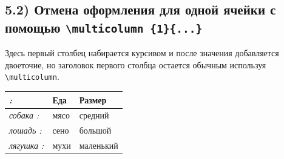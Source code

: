 \documentclass{article}
\begin{document}
\bigskip

\subsection*{5.2) Отмена оформления для одной ячейки с помощью \texttt{\textbackslash multicolumn \{1\}\{...\}}}

\noindent Здесь первый столбец набирается курсивом и после значения добавляется двоеточие, но заголовок первого столбца остается обычным используя \texttt{\textbackslash multicolumn}.

\medskip
\begin{tabular}{>{\itshape}l<{:}ll}
\toprule
\multicolumn{1}{l}{Животное} & Еда & Размер \\
\midrule
собака   & мясо & средний \\
лошадь   & сено & большой \\
лягушка  & мухи & маленький \\
\bottomrule
\end{tabular}
\end{document}
